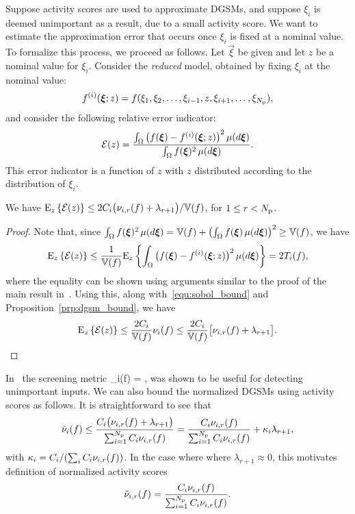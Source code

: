 Suppose activity scores
are used to approximate DGSMs, and suppose
$\xi_i$ is
deemed unimportant as a result, due to a small activity score. 
We want to estimate
the approximation error that occurs once $\xi_i$ is fixed at a nominal value.
To formalize this process, we proceed as follows.
Let $\vec\xi$ be given and let $z$ be a nominal value for $\xi_i$.  
Consider the \emph{reduced} model, 
obtained by fixing $\xi_i$ at the nominal value: 
\[
\redf{i}{z} = f(\xi_1, \xi_2, \ldots, \xi_{i-1}, z, \xi_{i+1}, \ldots, \xi_\Np),
\] 
and consider the following relative error indicator:
\[
\mathcal{E}(z) =
\frac{ \int_\Omega \big( f(\vec\xi) - \redf{i}{z}\big)^2 \, \mu(d\vec\xi) }
          {\int_\Omega f(\vec\xi)^2 \, \mu(d\vec\xi)}.
\] 
This error indicator is a function of $z$ with $z$ distributed 
according to the distribution of $\xi_i$.
\begin{theorem}\label{thm:error_estimate}
We have $\Ez{ \mathcal{E}(z)} \leq 2C_i\big(\act{f}{i}{r} + \lambda_{r+1}\big)/{\V(f)}$, 
for $1 \leq r < \Np$.
\end{theorem}
\begin{proof} 
Note that, since 
$\int_\Omega f(\vec\xi)^2 \, \mu(d\vec\xi) = \V(f) + 
\left(\int_\Omega f(\vec\xi) \, \mu(d\vec\xi)\right)^2 \geq \V(f)$, we have
\[
\Ez{ \mathcal{E}(z)} \leq \frac{1}{\V(f)} \Ez{ 
\int_\Omega \big( f(\vec\xi) - \redf{i}{z}\big)^2 \, \mu(d\vec\xi)}
= 2 T_i(f), 
\]
where the equality can be shown using arguments similar to the proof of the main result 
in~\cite{SobolTarantolaGatelliEtAl07}. Using this, along with~\eqref{equ:sobol_bound} and
Proposition~\ref{prp:dgsm_bound}, we have 
\[
\Ez{ \mathcal{E}(z)} \leq 
\frac{2C_i}{\V(f)}\nu_i(f)
\leq 
\frac{2C_i}{\V(f)}\big[\act{f}{i}{r} + \lambda_{r+1}\big]. \qedhere
\]
\end{proof}

In~\cite{Vohra:2018} the screening metric
\be
   \tilde{\nu}_i(f) = ,
\label{eq:ndgsm}
\ee
was shown to be useful for detecting unimportant inputs. 
We can also bound the normalized DGSMs using activity scores as follows. It is straightforward to see  
that
\[
\tilde{\nu}_i(f) \leq 
\frac{ C_i \big(\act{f}{i}{r} + \lambda_{r+1}\big)}{\sum_{i=1}^\Np C_i \act{f}{i}{r}}
=\frac{C_i \act{f}{i}{r}}{\sum_{i=1}^\Np C_i \act{f}{i}{r}} + \kappa_i \lambda_{r+1}, 
\]
with $\kappa_i = C_i / (\sum_i C_i \act{f}{i}{r})$. 
In the case where where $\lambda_{r+1} \approx 0$, 
this motivates definition of
normalized activity scores
\[
   \actt{f}{i}{r} =  \frac{C_i \act{f}{i}{r}}{\sum_{i=1}^\Np C_i \act{f}{i}{r}}.
\] 

